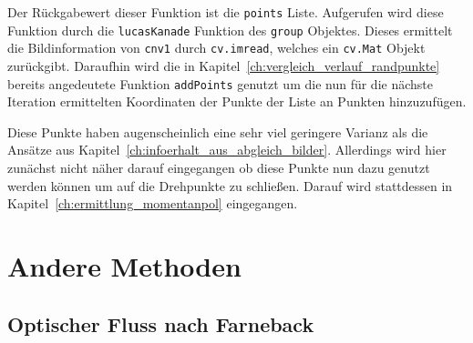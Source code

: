 Der Rückgabewert dieser Funktion ist die \lstinline{points} Liste.
Aufgerufen wird diese Funktion durch die \lstinline{lucasKanade} Funktion des \lstinline{group} Objektes.
Dieses ermittelt die Bildinformation von \lstinline{cnv1} durch \lstinline{cv.imread}, welches ein \lstinline{cv.Mat} Objekt zurückgibt.
Daraufhin wird die in Kapitel~\ref{ch:vergleich_verlauf_randpunkte} bereits angedeutete Funktion \lstinline{addPoints} genutzt um die nun für die nächste Iteration ermittelten Koordinaten der Punkte der Liste an Punkten hinzuzufügen.

Diese Punkte haben augenscheinlich eine sehr viel geringere Varianz als die Ansätze aus Kapitel~\ref{ch:infoerhalt_aus_abgleich_bilder}.
Allerdings wird hier zunächst nicht näher darauf eingegangen ob diese Punkte nun dazu genutzt werden können um auf die Drehpunkte zu schließen.
Darauf wird stattdessen in Kapitel~\ref{ch:ermittlung_momentanpol} eingegangen.






\section{Andere Methoden}

\subsection{Optischer Fluss nach Farneback}


